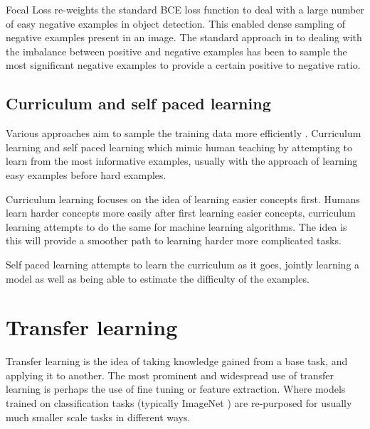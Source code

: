 Focal Loss \cite{Lin2017} re-weights the standard \gls{BCE} loss function to deal with a large number of easy negative examples in object detection. This enabled dense sampling of negative examples present in an image. The standard approach in to dealing with the imbalance between positive and negative examples has been to sample the most significant negative examples to provide a certain positive to negative ratio.
 
\subsection{Curriculum and self paced learning}


Various approaches aim to sample the training data more efficiently \cite{Loshchilov, Katharopoulos2018}. Curriculum learning and self paced learning which mimic human teaching by attempting to learn from the most informative examples, usually with the approach of learning easy examples before hard examples. 


Curriculum learning focuses on the idea of learning easier concepts first. Humans learn harder concepts more easily after first learning easier concepts, curriculum learning attempts to do the same for machine learning algorithms. The idea is this will provide a smoother path to learning harder more complicated tasks. \cite{TODO}

Self paced learning \cite{Kumar2010} attempts to learn the curriculum as it goes, jointly learning a model as well as being able to estimate the difficulty of the examples.






\section {Transfer learning}

Transfer learning is the idea of taking knowledge gained from a base task, and applying it to another. The most prominent and widespread use of transfer learning is perhaps the use of fine tuning or feature extraction.  Where models trained on classification tasks (typically ImageNet \cite{JiaDeng2009}) are re-purposed for usually much smaller scale tasks in different ways. 


